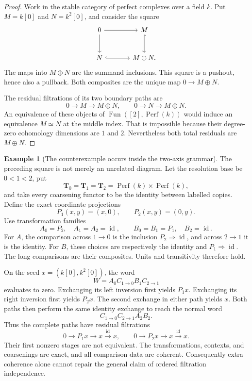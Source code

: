 \documentclass[11pt]{article}
\theoremstyle{definition}
\newtheorem{example}[theorem]{Example}
\theoremstyle{remark}
\newcommand{\Tcat}{\mathbf T}
\newcommand{\id}{\operatorname{id}}
\begin{document}
\begin{proof}
Work in the stable category of perfect complexes over a field $k$. Put $M=k[0]$ and $N=k^2[0]$, and consider the square
\[
\begin{tikzcd}[column sep=large,row sep=large]
0 \arrow[r] \arrow[d] & M \arrow[d,hook] \\
N \arrow[r,hook] & M\oplus N.
\end{tikzcd}
\]
The maps into $M\oplus N$ are the summand inclusions. This square is a pushout, hence also a pullback. Both composites are the unique map $0\to M\oplus N$.

The residual filtrations of its two boundary paths are
\[
0\longrightarrow M\longrightarrow M\oplus N,
\qquad
0\longrightarrow N\longrightarrow M\oplus N.
\]
An equivalence of these objects of $\operatorname{Fun}([2],\operatorname{Perf}(k))$ would induce an equivalence $M\simeq N$ at the middle index. That is impossible because their degree-zero cohomology dimensions are $1$ and $2$. Nevertheless both total residuals are $M\oplus N$.
\end{proof}

\begin{example}[The counterexample occurs inside the two-axis grammar]\label{ex:typed-diamond}
The preceding square is not merely an unrelated diagram. Let the resolution base be $0<1<2$, put
\[
\Tcat_0=\Tcat_1=\Tcat_2=\operatorname{Perf}(k)\times\operatorname{Perf}(k),
\]
and take every coarsening functor to be the identity between labelled copies. Define the exact coordinate projections
\[
P_1(x,y)=(x,0),\qquad P_2(x,y)=(0,y).
\]
Use transformation families
\[
A_0=P_2,\quad A_1=A_2=\id,
\qquad
B_0=B_1=P_1,\quad B_2=\id.
\]
For $A$, the comparison across $1\to0$ is the inclusion $P_2\Rightarrow\id$, and across $2\to1$ it is the identity. For $B$, these choices are respectively the identity and $P_1\Rightarrow\id$. The long comparisons are their composites. Units and transitivity therefore hold.

On the seed $x=(k[0],k^2[0])$, the word
\[
W=A_0C_{1\to0}B_1C_{2\to1}
\]
evaluates to zero. Exchanging its left inversion first yields $P_1x$. Exchanging its right inversion first yields $P_2x$. The second exchange in either path yields $x$. Both paths then perform the same identity exchange to reach the normal word
\[
C_{1\to0}C_{2\to1}A_2B_2.
\]
Thus the complete paths have residual filtrations
\[
0\to P_1x\to x\xrightarrow{\id}x,
\qquad
0\to P_2x\to x\xrightarrow{\id}x.
\]
Their first nonzero stages are not equivalent. The transformations, contexts, and coarsenings are exact, and all comparison data are coherent. Consequently extra coherence alone cannot repair the general claim of ordered filtration independence.
\end{example}
\end{document}
